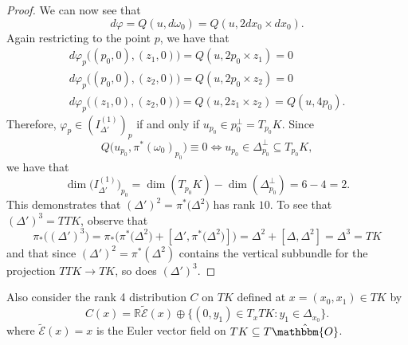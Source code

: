 \documentclass[11pt,letterpaper]{amsart}
\numberwithin{equation}{section}
\newcommand{\oct}{\hat{\mathbbm{O}}}
\begin{document}
\begin{proof}
    We can now see that
    \begin{equation}
        d\varphi = Q(u,d\omega_0) = Q(u,2dx_0\times dx_0).
    \end{equation}
    Again restricting to the point $p$, we have that 
    \begin{gather}
        d\varphi_{p}\big((p_0,0),(z_1,0)) = Q(u,2p_0\times z_1) = 0
        \\
        d\varphi_{p}\big((p_0,0),(z_2,0)) = Q(u,2p_0\times z_2) = 0
        \\
        d\varphi_{p}\big((z_1,0),(z_2,0)) = Q(u,2z_1\times z_2) = Q(u,4p_0).
    \end{gather}
    Therefore, $\varphi_{p}\in (I_{\Delta'}^{(1)})_p$ if and only if $u_{p_0}\in p_0^\perp = T_{p_0}K$. Since 
    \[
        Q\big(u_{p_0},\pi^*(\omega_0)_{p_0}\big) \equiv 0\Longleftrightarrow u_{p_0}\in \Delta^\perp_{p_0}\subseteq T_{p_0}K,
    \]
    we have that
    \begin{equation}
        \dim\big(I_{\Delta'}^{(1)}\big)_{p_0} = \dim(T_{p_0}K) - \dim(\Delta_{p_0}^\perp) = 6-4 = 2.
    \end{equation}
    This demonstrates that $(\Delta')^2 = \pi^*\big(\Delta^2\big)$ has rank $10$. To see that $(\Delta')^3 = TTK$, observe that
    \begin{equation}
        \pi_*\big((\Delta')^{3}\big) = \pi_*\big(\pi^*\big(\Delta^2\big) + [\Delta',\pi^*\big(\Delta^2\big)]\big) = \Delta^2 + [\Delta, \Delta^2] = \Delta^3 = TK
    \end{equation}
    and that since $(\Delta')^2 = \pi^*(\Delta^2)$ contains the vertical subbundle for the projection $TTK\to TK$, so does $(\Delta')^3$.
\end{proof}

Also consider the rank 4 distribution $C$ on $TK$ defined at $x= (x_0 , x_1)\in TK$ by
\begin{equation}
\label{def C}
    C(x) = \mathbb{R}\tilde{\mathcal{E}}(x) \oplus \{(0,y_1)\in T_xTK: y_1\in \Delta_{x_0}\}.
\end{equation}
where $\tilde{\mathcal{E}}(x) = x$ is the Euler vector field on $TK\subseteq T\oct$.
\end{document}
